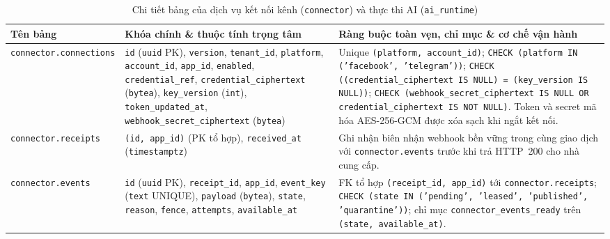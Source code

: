 \begin{table}[htbp]
  \centering
  \footnotesize
  \setlength{\tabcolsep}{4pt}
  \renewcommand{\arraystretch}{1.12}
  \caption{Chi tiết bảng của dịch vụ kết nối kênh (\texttt{connector}) và thực thi AI (\texttt{ai\_runtime})}\label{tab:app-connector-ai}
  \begin{tabularx}{\linewidth}{@{}
    >{\raggedright\arraybackslash}p{3.4cm}
    >{\raggedright\arraybackslash}p{5.0cm}
    >{\raggedright\arraybackslash}X@{}}
    \toprule
    Tên bảng & Khóa chính \& thuộc tính trọng tâm & Ràng buộc toàn vẹn, chỉ mục \& cơ chế vận hành \\
    \midrule
    \texttt{connector.\hspace{0pt}connections} &
    \texttt{id} (\texttt{uuid} PK), \texttt{version}, \texttt{tenant\_id}, \texttt{platform}, \texttt{account\_id}, \texttt{app\_id}, \texttt{enabled}, \texttt{credential\_ref}, \texttt{credential\_\hspace{0pt}ciphertext} (\texttt{bytea}), \texttt{key\_version} (\texttt{int}), \texttt{token\_updated\_at}, \texttt{webhook\_\hspace{0pt}secret\_\hspace{0pt}ciphertext} (\texttt{bytea}) &
    Unique \texttt{(platform, account\_id)}; \texttt{CHECK (platform IN ('facebook', 'telegram'))}; \texttt{CHECK ((credential\_\hspace{0pt}ciphertext IS NULL) = (key\_version IS NULL))}; \texttt{CHECK (webhook\_\hspace{0pt}secret\_\hspace{0pt}ciphertext IS NULL OR credential\_\hspace{0pt}ciphertext IS NOT NULL)}. Token và secret mã hóa AES-256-GCM được xóa sạch khi ngắt kết nối. \\
    \texttt{connector.\hspace{0pt}receipts} &
    \texttt{(id, app\_id)} (PK tổ hợp), \texttt{received\_at} (\texttt{timestamptz}) &
    Ghi nhận biên nhận webhook bền vững trong cùng giao dịch với \texttt{connector.\hspace{0pt}events} trước khi trả HTTP~200 cho nhà cung cấp. \\
    \texttt{connector.\hspace{0pt}events} &
    \texttt{id} (\texttt{uuid} PK), \texttt{receipt\_id}, \texttt{app\_id}, \texttt{event\_key} (\texttt{text} UNIQUE), \texttt{payload} (\texttt{bytea}), \texttt{state}, \texttt{reason}, \texttt{fence}, \texttt{attempts}, \texttt{available\_at} &
    FK tổ hợp \texttt{(receipt\_id, app\_id)} tới \texttt{connector.\hspace{0pt}receipts}; \texttt{CHECK (state IN ('pending', 'leased', 'published', 'quarantine'))}; chỉ mục \texttt{connector\_\hspace{0pt}events\_\hspace{0pt}ready} trên \texttt{(state, available\_at)}. \\

\end{tabularx}
\end{table}
